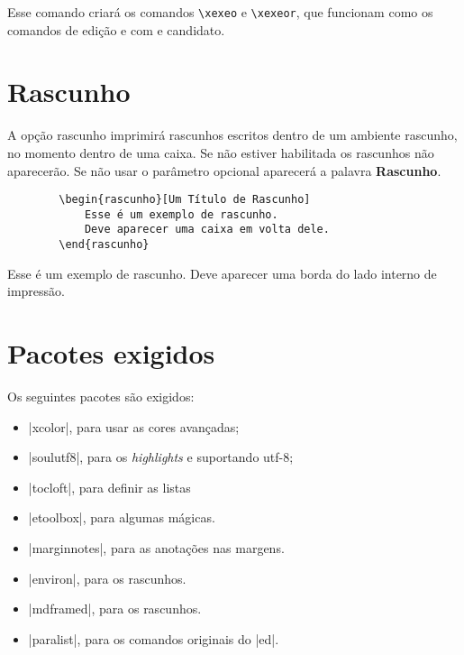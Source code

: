 \documentclass{article}
\begin{document}
    Esse comando criará os comandos \verb!\xexeo! e \verb!\xexeor!, que funcionam como os comandos de edição  e com  e candidato.
    
    \section{Rascunho}
    
    A opção rascunho imprimirá rascunhos escritos dentro de um ambiente rascunho, no momento dentro de uma caixa. Se não estiver habilitada os rascunhos não aparecerão. Se não usar o parâmetro opcional aparecerá a palavra \textbf{Rascunho}.
    
    \begin{verbatim}
        \begin{rascunho}[Um Título de Rascunho]
            Esse é um exemplo de rascunho.
            Deve aparecer uma caixa em volta dele.
        \end{rascunho}
    \end{verbatim}
    
    \begin{rascunho}
        Esse é um exemplo de rascunho.
        Deve aparecer uma borda do lado interno de impressão.
    \end{rascunho}
    
    \section{Pacotes exigidos}
    
    Os seguintes pacotes são exigidos:
    \begin{itemize}
        \item |xcolor|, para usar as cores avançadas;
        \item |soulutf8|, para os \textit{highlights} e suportando utf-8;
        \item |tocloft|, para definir as listas
        \item |etoolbox|, para algumas mágicas.
        \item |marginnotes|, para as anotações nas margens.
        \item |environ|, para os rascunhos.
        \item |mdframed|, para os rascunhos.
        \item |paralist|, para os comandos originais do |ed|.
    \end{itemize}
    
\end{document}
